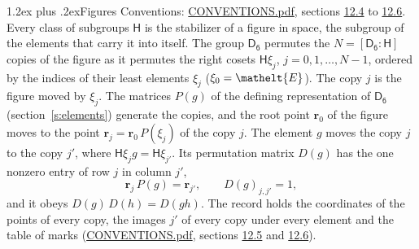 \documentclass[10pt,a4paper]{article}
\makeatletter
\renewcommand\section{\@startsection{section}{1}{\z@}{-3ex plus -1ex minus -.2ex}%
  {1.2ex plus .2ex}{\normalfont\large\sffamily\bfseries\color{parttitle}}}
\numberwithin{equation}{section}
\newcommand{\eltfont}[1]{{\let\sigma\eltsigma\mathelt{#1}}}
\newcommand{\grp}[1]{\mathsf{#1}}
\newcommand{\cls}[1]{\eltfont{#1}}
\newcommand{\pointr}{\mathbf{r}}
\makeatother
\begin{document}
\section{Figures}\label{s:permutation}
Conventions: \href{../../CONVENTIONS.pdf}{CONVENTIONS.pdf}, sections \href{../../CONVENTIONS.pdf\#conv.12.4}{12.4} to \href{../../CONVENTIONS.pdf\#conv.12.6}{12.6}.
Every class of subgroups $\grp{H}$ is the stabilizer of a figure in space, the subgroup of the elements that carry it into itself. \label{n:local.orbit.size}\label{n:element.coset.least}\label{n:index.coset}The group $\grp{D_{6}}$ permutes the $N = [\grp{D_{6}} : \grp{H}]$ copies of the figure as it permutes the right cosets $\grp{H}\xi_j$, $j = 0, 1, \dots, N - 1$, ordered by the indices of their least elements $\xi_j$ ($\xi_0 = \cls{E}$). The copy $j$ is the figure moved by $\xi_j$. The matrices $P(g)$ of the defining representation of $\grp{D_{6}}$ (section~\ref{s:elements}) generate the copies, and the root point $\pointr_0$ of the figure moves to the point $\pointr_j = \pointr_0\, P(\xi_j)$ of the copy $j$. \label{n:local.coset.image}The element $g$ moves the copy $j$ to the copy $j'$, where $\grp{H}\xi_j g = \grp{H}\xi_{j'}$. \label{n:local.matrix.permutation}Its permutation matrix $D(g)$ has the one nonzero entry of row $j$ in column $j'$,
\begin{equation}\label{e:perm.matrix}\pointr_j\, P(g) = \pointr_{j'}, \qquad D(g)_{j,j'} = 1,\end{equation}
and it obeys $D(g)\, D(h) = D(gh)$. The record holds the coordinates of the points of every copy, the images $j'$ of every copy under every element and the table of marks (\href{../../CONVENTIONS.pdf}{CONVENTIONS.pdf}, sections \href{../../CONVENTIONS.pdf\#conv.12.5}{12.5} and \href{../../CONVENTIONS.pdf\#conv.12.6}{12.6}).
\end{document}
